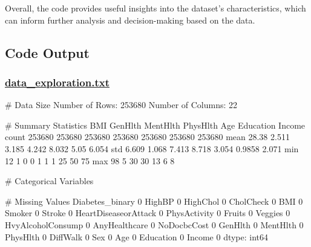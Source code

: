 \documentclass[11pt]{article}
\begin{document}
Overall, the code provides useful insights into the dataset's characteristics, which can inform further analysis and decision-making based on the data.

\subsection{Code Output}\hypertarget{file-data-exploration-txt}{}

\subsubsection*{\hyperlink{code-Data Exploration-data-exploration-txt}{data\_exploration.txt}}

\begin{codeoutput}
# Data Size
Number of Rows: 253680
Number of Columns: 22

# Summary Statistics
         BMI  GenHlth  MentHlth  PhysHlth    Age  Education  Income
count 253680   253680    253680    253680 253680     253680  253680
mean   28.38    2.511     3.185     4.242  8.032       5.05   6.054
std    6.609    1.068     7.413     8.718  3.054     0.9858   2.071
min       12        1         0         0      1          1       1
25%
50%
75%
max       98        5        30        30     13          6       8

# Categorical Variables

# Missing Values
Diabetes_binary         0
HighBP                  0
HighChol                0
CholCheck               0
BMI                     0
Smoker                  0
Stroke                  0
HeartDiseaseorAttack    0
PhysActivity            0
Fruits                  0
Veggies                 0
HvyAlcoholConsump       0
AnyHealthcare           0
NoDocbcCost             0
GenHlth                 0
MentHlth                0
PhysHlth                0
DiffWalk                0
Sex                     0
Age                     0
Education               0
Income                  0
dtype: int64


\end{codeoutput}
\end{document}
